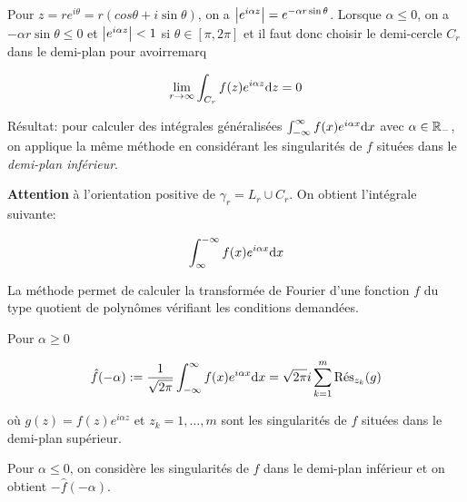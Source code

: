 \begin{remark}[1]
    Pour $z = r e^{i\theta} = r(cos \theta + i \sin \theta)$, on a $\module{e^{i\alpha z}} = e^{-\alpha r \sin \theta}$.
    Lorsque $\alpha \leq 0$, on a $-\alpha r \sin \theta \leq 0$ et $\module{e^{i\alpha z}} < 1$ si $\theta \in [\pi, 2\pi]$ et il faut donc choisir le demi-cercle $C_r$ dans le demi-plan pour avoirremarq
    
    \[ \lim_{r \rightarrow \infty} \int_{C_r} f(z) e^{i\alpha z} \dz = 0 \]
    
    Résultat: pour calculer des intégrales généralisées $\int_{-\infty}^\infty f(x) e^{i\alpha x} \dx$ avec $\alpha \in \R_-$, on applique la même méthode en considérant les singularités de $f$ situées dans le \textit{demi-plan inférieur}.
    
    \textbf{Attention} à l'orientation positive de $\gamma_r = L_r \cup C_r$.
    On obtient l'intégrale suivante:
    
    \[ \int_{\infty}^{-\infty} f(x) e^{i\alpha x} \dx \]
\end{remark}

\begin{remark}[2]
    La méthode permet de calculer la transformée de Fourier d'une fonction $f$ du type quotient de polynômes vérifiant les conditions demandées.
    
    Pour $\alpha \geq 0$
    
    \[ \hat{f}(-\alpha) := \ostpi \int_{-\infty}^\infty f(x)e^{i\alpha x} \dx = \sqrt{2\pi} i \sum_{k = 1}^m \Res_{z_k}(g) \]
    
    où $g(z) = f(z) e^{i\alpha z}$ et $z_k = 1, \ldots, m$ sont les singularités de $f$ situées dans le demi-plan supérieur.
    
    Pour $\alpha \leq 0$, on considère les singularités de $f$ dans le demi-plan inférieur et on obtient $-\hat{f}(-\alpha)$.
\end{remark}
